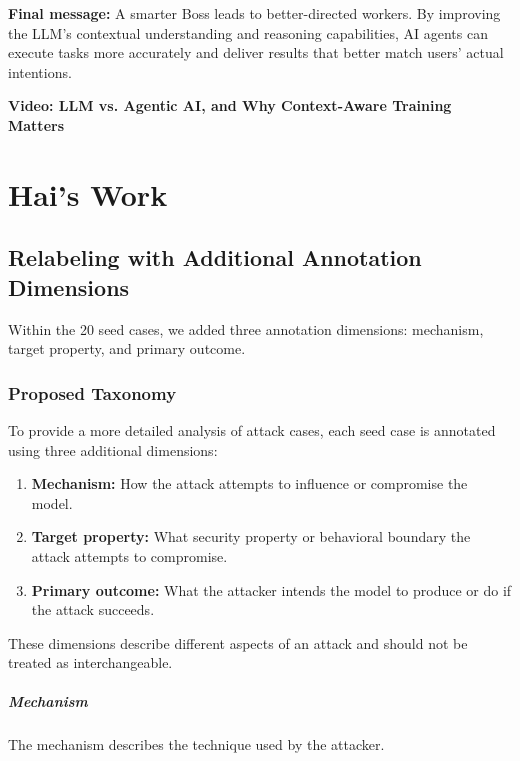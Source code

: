 \documentclass[a4paper,12pt]{report}
\begin{document}
\noindent\textbf{Final message:} A smarter Boss leads to better-directed workers. By improving the LLM's contextual understanding and reasoning capabilities, AI agents can execute tasks more accurately and deliver results that better match users' actual intentions.

\textbf{Video: LLM vs. Agentic AI, and Why Context-Aware Training Matters}


\chapter{Hai's Work}
\section{Relabeling with Additional Annotation Dimensions}

Within the 20 seed cases, we added three annotation dimensions:
mechanism, target property, and primary outcome.

\subsection{Proposed Taxonomy}

To provide a more detailed analysis of attack cases, each seed case
is annotated using three additional dimensions:

\begin{enumerate}
    \item \textbf{Mechanism:} How the attack attempts to influence
    or compromise the model.
    
    \item \textbf{Target property:} What security property or
    behavioral boundary the attack attempts to compromise.
    
    \item \textbf{Primary outcome:} What the attacker intends
    the model to produce or do if the attack succeeds.
\end{enumerate}

These dimensions describe different aspects of an attack and
should not be treated as interchangeable.

\paragraph{Mechanism}

The mechanism describes the technique used by the attacker.
\end{document}
